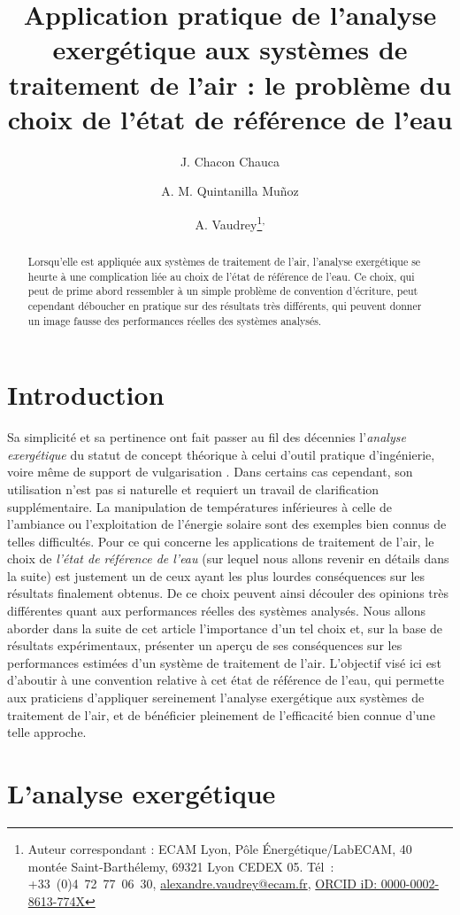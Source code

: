 \documentclass[a4paper,11pt]{scrartcl}
\title{Application pratique de l'analyse exergétique aux systèmes de traitement de l'air : le problème du choix de l'état de référence de l'eau}
\author[1,2]{J. Chacon Chauca}
\author[3]{A. M. Quintanilla Muñoz}
\author[2]{A. Vaudrey\thanks{Auteur correspondant : ECAM Lyon, Pôle Énergétique/LabECAM, 40 montée Saint-Barthélemy, 69321 Lyon CEDEX 05. Tél : +33 (0)4 72 77 06 30, \href{mailto:alexandre.vaudrey@ecam.fr}{alexandre.vaudrey@ecam.fr}, \href{http://orcid.org/0000-0002-8613-774X}{ORCID iD: 0000-0002-8613-774X}}\textsuperscript{,}}
\affil[1]{Université de Lyon, ECAM Lyon, INSA-Lyon, LabECAM, F-69005, France.}
\affil[2]{Pontificia Universidad Cat\'olica del Per\'u (PUCP), Laboratorio
de Energ\'ia, Lima, Per\'u.}
\affil[3]{Département Énergie, Institut FEMTO-ST, UMR 6174, CNRS, Université de Bourgogne Franche-Comté, Belfort, France.}
\begin{document}
\maketitle

\begin{abstract}
	Lorsqu'elle est appliquée aux systèmes de traitement de l'air, l'analyse
	exergétique se heurte à une complication liée au choix de l'état de
	référence de l'eau. Ce choix, qui peut de prime abord ressembler à un
	simple problème de convention d'écriture, peut cependant déboucher en
	pratique sur des résultats très différents, qui peuvent donner un image
	fausse des performances réelles des systèmes analysés.
\end{abstract}

\section{Introduction}

Sa simplicité et sa pertinence ont fait passer au fil des décennies
l'\emph{analyse exergétique} du statut de concept théorique à celui d'outil
pratique d'ingénierie, voire même de support de vulgarisation \cite{SV-2013}.
Dans certains cas cependant, son utilisation n’est pas si naturelle et requiert
un travail de clarification supplémentaire. La manipulation de températures
inférieures à celle de l’ambiance \cite{RGT-035-0651} ou l’exploitation de
l’énergie solaire \cite{EPL-104-40008} sont des exemples bien connus de telles
difficultés. Pour ce qui concerne les applications de traitement de l’air, le
choix de \emph{l’état de référence de l’eau} (sur lequel nous allons revenir en
détails dans la suite) est justement un de ceux ayant les plus lourdes
conséquences sur les résultats finalement obtenus. De ce choix peuvent ainsi
découler des opinions très différentes quant aux performances réelles des
systèmes analysés. Nous allons aborder dans la suite de cet article l’importance
d’un tel choix et, sur la base de résultats expérimentaux, présenter un aperçu
de ses conséquences sur les performances estimées d’un système de traitement de
l’air. L’objectif visé ici est d’aboutir à une convention relative à cet état de
référence de l’eau, qui permette aux praticiens d’appliquer sereinement
l’analyse exergétique aux systèmes de traitement de l’air, et de bénéficier
pleinement de l’efficacité bien connue d’une telle approche.

\section{L'analyse exergétique}
\end{document}
